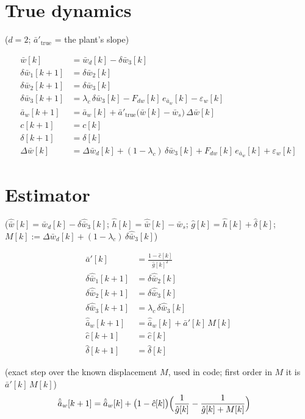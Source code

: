\documentclass[11pt,a4paper,fontset=none]{ctexart}
\newcommand{\ba}{\bar{a}}
\newcommand{\bw}{\bar{w}}
\newcommand{\dW}{\Delta\bw}
\newcommand{\ap}{\ba'}
\newcommand{\ah}{\hat{\ba}_w}
\newcommand{\wh}{\hat{\bw}}
\newcommand{\hh}{\hat{h}}
\newcommand{\ch}{\hat{c}}
\newcommand{\dl}{\delta}
\newcommand{\dlh}{\hat{\delta}}
\newcommand{\gh}{\hat{g}}
\begin{document}
\section{True dynamics}

($d = 2$; $\ap_{\mathrm{true}}$ = the plant's slope)

\begin{align*}
\bw[k]           &= \bw_d[k] - \delta\bw_3[k] \\
\delta\bw_1[k+1] &= \delta\bw_2[k] \\
\delta\bw_2[k+1] &= \delta\bw_3[k] \\
\delta\bw_3[k+1] &= \lambda_c\,\delta\bw_3[k] - F_{dw}[k]\,e_{\ba_w}[k] - \varepsilon_w[k] \\
\ba_w[k+1]       &= \ba_w[k] + \ap_{\mathrm{true}}\bigl(\bw[k]-\bw_s\bigr)\,\dW[k] \\
c[k+1]           &= c[k] \\
\dl[k+1]         &= \dl[k] \\[4pt]
\dW[k]           &= \Delta\bw_d[k] + (1-\lambda_c)\,\delta\bw_3[k] + F_{dw}[k]\,e_{\ba_w}[k] + \varepsilon_w[k]
\end{align*}

\section{Estimator}

($\wh[k] = \bw_d[k] - \delta\hat{\bw}_3[k]$; $\hh[k] = \wh[k] - \bw_s$; $\gh[k] = \hh[k] + \dlh[k]$; $M[k] := \Delta\bw_d[k] + (1-\lambda_c)\,\delta\hat{\bw}_3[k]$)

\begin{align*}
\ap[k]                 &= \frac{1 - \ch[k]}{\gh[k]^{2}} \\
\delta\hat{\bw}_1[k+1] &= \delta\hat{\bw}_2[k] \\
\delta\hat{\bw}_2[k+1] &= \delta\hat{\bw}_3[k] \\
\delta\hat{\bw}_3[k+1] &= \lambda_c\,\delta\hat{\bw}_3[k] \\
\ah[k+1]               &= \ah[k] + \ap[k]\,M[k] \\
\ch[k+1]               &= \ch[k] \\
\dlh[k+1]              &= \dlh[k]
\end{align*}

(exact step over the known displacement $M$, used in code; first order in $M$ it is $\ap[k]\,M[k]$)
\begin{align*}
\ah[k+1]               &= \ah[k] + \bigl(1 - \ch[k]\bigr)\Bigl(\frac{1}{\gh[k]} - \frac{1}{\gh[k] + M[k]}\Bigr)
\end{align*}
\end{document}
